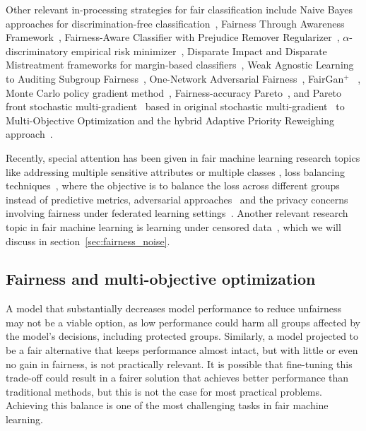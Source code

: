 Other relevant in-processing strategies for fair classification include Naive Bayes approaches for discrimination-free classification~\citep{Calders2010}, Fairness Through Awareness Framework~\citep{Dwork2011}, Fairness-Aware Classifier with Prejudice Remover Regularizer~\cite{Kamishima2012}, $\alpha$-discriminatory empirical risk minimizer~\citep{Woodworth2017}, Disparate Impact and Disparate Mistreatment frameworks for margin-based classifiers~\citep{Zafar2017a,Zafar2017b}, Weak Agnostic Learning to Auditing Subgroup Fairness~\citep{pmlr-v80-kearns18a,Kearns2018}, One-Network Adversarial Fairness~\citep{Adel2019}, FairGan$^{+}$ ~\citep{Xu2019}, Monte Carlo policy gradient method~\citep{Petrovic2021}, Fairness-accuracy Pareto~\citep{Wei2022}, and Pareto front stochastic multi-gradient~\citep{Liu2022} based in original stochastic multi-gradient~\citep{Mercier2018} to Multi-Objective Optimization and the hybrid Adaptive Priority Reweighing approach~\cite{HuXT23}.

Recently, special attention has been given in fair machine learning research topics like addressing multiple sensitive attributes or multiple classes \cite{DAloisio2023,Liu_Wang_Wang_Wang_Su_Gao_2023}, loss balancing techniques~\cite{KIM2023231,KhaliliZA23}, where the objective is to balance the loss across different groups instead of predictive metrics, adversarial approaches~\cite{Liang2023,ZhangZLZY23,GrariLD23,MousaviMD23,Zeming2023,Yuchen2023} and the privacy concerns involving fairness under federated learning settings~\cite{ChenZZZY24,VucinichZ23}. Another relevant research topic in fair machine learning is learning under censored data~\cite{WZhang2022,WZhang2023_a,WZhang2023_b,WZhang2023_c}, which we will discuss in section~\ref{sec:fairness_noise}.


\subsection{Fairness and multi-objective optimization}

A model that substantially decreases model performance to reduce unfairness may not be a viable option, as low performance could harm all groups affected by the model's decisions, including protected groups. Similarly, a model projected to be a fair alternative that keeps performance almost intact, but with little or even no gain in fairness, is not practically relevant. It is possible that fine-tuning this trade-off could result in a fairer solution that achieves better performance than traditional methods, but this is not the case for most practical problems. Achieving this balance is one of the most challenging tasks in fair machine learning.

